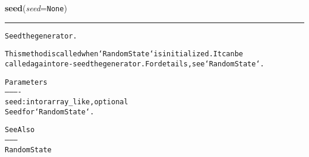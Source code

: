     \label{trunk:qstkutil:bollinger:seed}

    \vspace{0.5ex}

\hspace{.8\funcindent}\begin{boxedminipage}{\funcwidth}

    \raggedright \textbf{seed}(\textit{seed}={\tt None})

    \vspace{-1.5ex}

    \rule{\textwidth}{0.5\fboxrule}
\setlength{\parskip}{2ex}
\begin{alltt}
Seed the generator.

This method is called when `RandomState` is initialized. It can be
called again to re-seed the generator. For details, see `RandomState`.

Parameters
----------
seed : int or array\_like, optional
    Seed for `RandomState`.

See Also
--------
RandomState
\end{alltt}

\setlength{\parskip}{1ex}
    \end{boxedminipage}

    \label{trunk:qstkutil:bollinger:set_state}

    \vspace{0.5ex}

